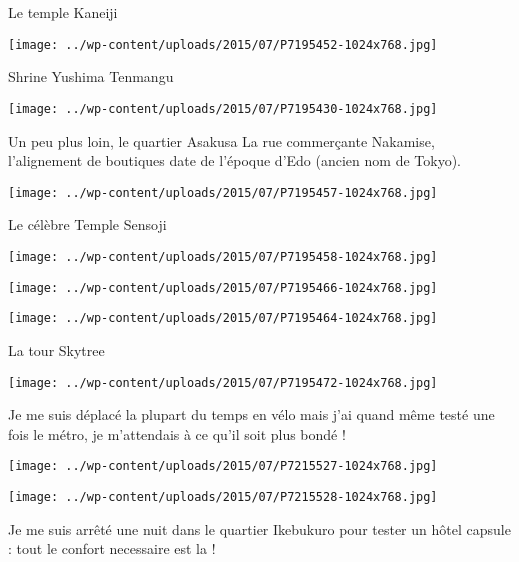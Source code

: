  \newline
 Le temple Kaneiji \newline
 \newline
\centerline{\texttt{[image: ../wp-content/uploads/2015/07/P7195452-1024x768.jpg]} } 
 \newline
 Shrine Yushima Tenmangu \newline
 \newline
\centerline{\texttt{[image: ../wp-content/uploads/2015/07/P7195430-1024x768.jpg]} } 
 \newline
 Un peu plus loin, le quartier Asakusa \newline
 La rue commerçante Nakamise, l'alignement de boutiques date de l'époque d'Edo (ancien nom de Tokyo). \newline
 \newline
\centerline{\texttt{[image: ../wp-content/uploads/2015/07/P7195457-1024x768.jpg]} } 
 \newline
 Le célèbre Temple Sensoji \newline
 \newline
\centerline{\texttt{[image: ../wp-content/uploads/2015/07/P7195458-1024x768.jpg]} } 
 \newline
 \newline
\centerline{\texttt{[image: ../wp-content/uploads/2015/07/P7195466-1024x768.jpg]} } 
 \newline
 \newline
\centerline{\texttt{[image: ../wp-content/uploads/2015/07/P7195464-1024x768.jpg]} } 
 \newline
 La tour Skytree \newline
 \newline
\centerline{\texttt{[image: ../wp-content/uploads/2015/07/P7195472-1024x768.jpg]} } 
 \newline
 Je me suis déplacé la plupart du temps en vélo mais j'ai quand même testé une fois le métro, je m'attendais à ce qu'il soit plus bondé ! \newline
 \newline
\centerline{\texttt{[image: ../wp-content/uploads/2015/07/P7215527-1024x768.jpg]} } 
 \newline
 \newline
\centerline{\texttt{[image: ../wp-content/uploads/2015/07/P7215528-1024x768.jpg]} } 
 \newline
 Je me suis arrêté une nuit dans le quartier Ikebukuro pour tester un hôtel capsule : tout le confort necessaire est la ! \newline
